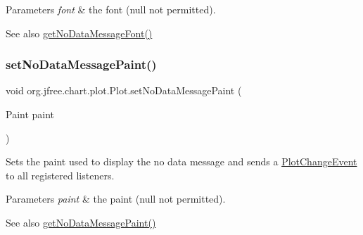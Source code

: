 \begin{DoxyParams}{Parameters}
{\em font} & the font ({\ttfamily null} not permitted).\\
\hline
\end{DoxyParams}
\begin{DoxySeeAlso}{See also}
\mbox{\hyperlink{classorg_1_1jfree_1_1chart_1_1plot_1_1_plot_a6134fc2403602286e07e6773f963c6f6}{get\+No\+Data\+Message\+Font()}} 
\end{DoxySeeAlso}
\mbox{\label{classorg_1_1jfree_1_1chart_1_1plot_1_1_plot_a5c60638325f40e3bc67520ef612872d9}} 
\subsubsection{\texorpdfstring{set\+No\+Data\+Message\+Paint()}{setNoDataMessagePaint()}}
{\footnotesize\ttfamily void org.\+jfree.\+chart.\+plot.\+Plot.\+set\+No\+Data\+Message\+Paint (\begin{DoxyParamCaption}\item[{Paint}]{paint }\end{DoxyParamCaption})}

Sets the paint used to display the \textquotesingle{}no data\textquotesingle{} message and sends a \mbox{\hyperlink{}{Plot\+Change\+Event}} to all registered listeners.


\begin{DoxyParams}{Parameters}
{\em paint} & the paint ({\ttfamily null} not permitted).\\
\hline
\end{DoxyParams}
\begin{DoxySeeAlso}{See also}
\mbox{\hyperlink{classorg_1_1jfree_1_1chart_1_1plot_1_1_plot_a0fc5a1f4190e5a464857145a7ad15286}{get\+No\+Data\+Message\+Paint()}} 
\end{DoxySeeAlso}
\mbox{\label{classorg_1_1jfree_1_1chart_1_1plot_1_1_plot_a2c5acdb70d34e3449b99e8ad646140db}} 
